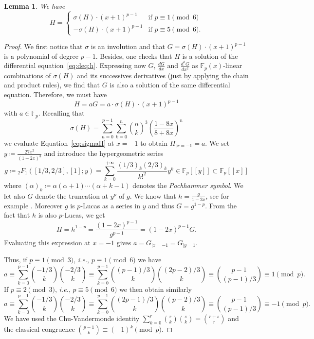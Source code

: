 \documentclass{article}
\newcommand{\F}{\mathbb{F}}
\newcommand{\ps}[1]{[\![#1]\!]}
\def\pFq#1#2#3#4#5{{}_{#1}F_{#2}\left(#3, #4; #5\right)}
\theoremstyle{definition}
\theoremstyle{plain}
\newtheorem{lem}[defi]{Lemma}
\theoremstyle{remark}
\begin{document}
\begin{lem} \label{lem:sigmaH}
    We have 
    \[H=\begin{cases}
        \sigma(H)\cdot (x+1)^{p-1} & \text{if $p\equiv 1 \pmod 6$}\\
      - \sigma(H)\cdot (x+1)^{p-1} & \text{if $p\equiv 5 \pmod 6$.}
    \end{cases}\]
\end{lem}
\begin{proof}
    We first notice that $\sigma$ is an involution and that $G=\sigma(H) \cdot (x+1)^{p-1}$ is a polynomial of degree $p{-}1$.
    Besides, one checks that $H$ is a solution of the differential equation~\eqref{eq:deq:h}.
    Expressing now $G$, $\frac{dG}{dx}$ and $\frac{d^2G}{dx^2}$ as $\F_p(x)$-linear combinations of $\sigma(H)$ and its successives derivatives (just by applying the chain and product rules), we find that $G$ is also a solution of the same differential equation.
    Therefore, we must have
    \begin{equation} \label{eq:sigmaH} 
      H=aG = a\cdot \sigma(H) \cdot (x+1)^{p-1}
    \end{equation}
    with $a\in \F_p$.
    Recalling that 
    \[\sigma(H)=\sum_{n=0}^{p-1}\sum_{k=0}^n \binom{n}{k}^3\left(\frac{1-8x}{8+8x}\right)^n\]
    we evaluate Equation~\eqref{eq:sigmaH} at $x=-1$ to obtain $H_{|x=-1}=a$.
    We set $y \coloneqq \frac{ 27 x^2}{(1 - 2x)^3}$ and introduce the
    hypergeometric series
    \[g \coloneqq \pFq 2 1 {[1/3, 2/3]} {[1]} {y} = 
      \sum_{k=0}^{+\infty} \frac{(1/3)_k (2/3)_k}{k!^2} y^k \in \F_p\ps y \subset \F_p\ps{x}\]
    where $(\alpha)_k \coloneq \alpha (\alpha{+}1) \cdots (\alpha{+}k{-}1)$ denotes the \emph{Pochhammer symbol}.
    We let also $G$ denote the truncation at $y^p$ of $g$. We know that
    $h=\frac{g}{1-2x}$, see for example \cite[Ex.~3.4]{SZ15}.  Moreover $g$ is $p$-Lucas as a series in $y$ and thus $G = g^{1-p}$. 
    From the fact that $h$ is also $p$-Lucas, we get
    \[H=h^{1-p} = \frac{(1-2x)^{p-1}}{g^{p-1}}=(1-2x)^{p-1}G. \]
    Evaluating this expression at $x=-1$ gives $a = G_{|x=-1} = G_{|y=1}$.   
    
    Thus, if $p\equiv 1 \pmod 3$, \emph{i.e.}, $p\equiv 1 \pmod 6$ we have
    \[a\equiv  \sum_{k=0}^{p-1}\binom{-1/3}{k}\binom{-2/3}{k} \equiv \sum_{k=0}^{p-1}\binom{(p{-}1)/3}{k}\binom{(2p-2)/3}{k}\equiv\binom{p{-}1}{(p{-}1)/3}\equiv 1 \pmod p.\]
    If $p\equiv 2 \pmod 3$, \emph{i.e.}, $p\equiv 5 \pmod 6$ we then obtain similarly
    \[a\equiv  \sum_{k=0}^{p-1}\binom{-1/3}{k}\binom{-2/3}{k} \equiv \sum_{k=0}^{p-1}\binom{(2p{-}1)/3}{k}\binom{(p-2)/3}{k}\equiv\binom{p{-}1}{(p{-}1)/3}\equiv -1 \pmod p.\]
    We have used the Chu-Vandermonde identity $\sum_{k=0}^r\binom{r}{k}\binom{s}{k}=\binom{r+s}{r}$ and the classical congruence $\binom{p{-}1}{k}\equiv (-1)^k \pmod p$.    
\end{proof}
\end{document}
